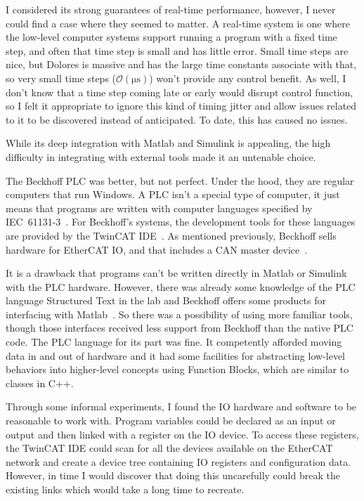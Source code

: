 \documentclass[english,12pt,a4paper,pdftex,eng,utf8]{aaltothesis}
\begin{document}
I considered its strong guarantees of real-time performance, however, I never could find a case where they seemed to matter.  A real-time system is one where the low-level computer systems support running a program with a fixed time step, and often that time step is small and has little error.  Small time steps are nice, but Dolores is massive and has the large time constants associate with that, so very small time steps ($\mathcal{O}(\unit{\micro\second})$) won't provide any control benefit.  As well, I don't know that a time step coming late or early would disrupt control function, so I felt it appropriate to ignore this kind of timing jitter and allow issues related to it to be discovered instead of anticipated.  To date, this has caused no issues.

While its deep integration with Matlab and Simulink is appealing, the high difficulty in integrating with external tools made it an untenable choice.

The Beckhoff PLC was better, but not perfect.  Under the hood, they are regular computers that run Windows.  A PLC isn't a special type of computer, it just means that programs are written with computer languages specified by \mbox{IEC 61131-3}~\cite{IEC61131-3}.  For Beckhoff's systems, the development tools for these languages are provided by the TwinCAT IDE~\cite{BeckhoffTwinCAT}.  As mentioned previously, Beckhoff sells hardware for EtherCAT IO, and that includes a CAN master device~\cite{BeckhoffEL6751}.

It is a drawback that programs can't be written directly in Matlab or Simulink with the PLC hardware.  However, there was already some knowledge of the PLC language Structured Text in the lab and Beckhoff offers some products for interfacing with Matlab~\cite{BeckhoffMatlabInterface}.  So there was a possibility of using more familiar tools, though those interfaces received less support from Beckhoff than the native PLC code.  The PLC language for its part was fine.  It competently afforded moving data in and out of hardware and it had some facilities for abstracting low-level behaviors into higher-level concepts using Function Blocks, which are similar to classes in C++.

Through some informal experiments, I found the IO hardware and software to be reasonable to work with.  Program variables could be declared as an input or output and then linked with a register on the IO device.  To access these registers, the TwinCAT IDE could scan for all the devices available on the EtherCAT network and create a device tree containing IO registers and configuration data.  However, in time I would discover that doing this uncarefully could break the existing links which would take a long time to recreate.
\end{document}
